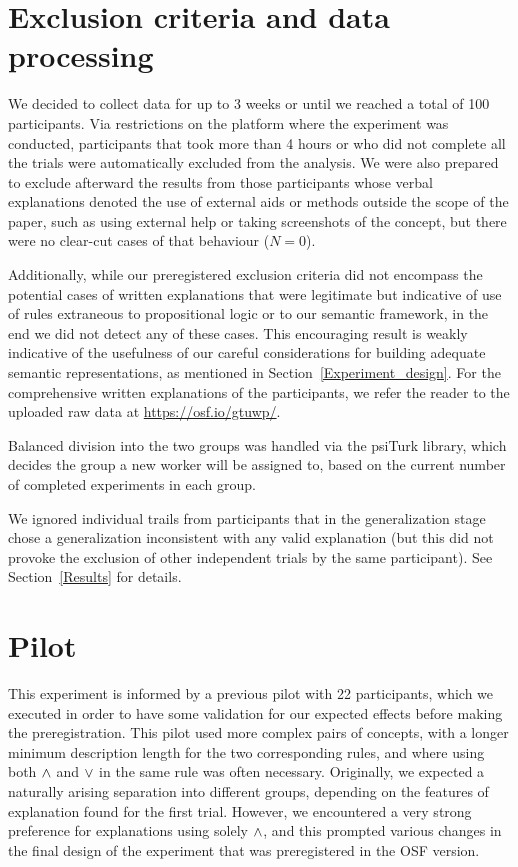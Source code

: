 \newpage
\begin{appendices}



\section{Exclusion criteria and data processing}\label{Sec:ExclusionCriteria}

We decided to collect data for up to 3 weeks or until we reached a total of 100 participants. Via restrictions on the platform where the experiment was conducted, participants that took more than 4 hours or who did not complete all the trials were automatically excluded from the analysis. We were also prepared to exclude afterward the results from those participants whose verbal explanations denoted the use of external aids or methods outside the scope of the paper, such as using external help or taking screenshots of the concept, but there were no clear-cut cases of that behaviour ($N=0$).  

 Additionally, while our preregistered exclusion criteria did not encompass the potential cases of written explanations that were legitimate but indicative of use of rules extraneous to propositional logic or to our semantic framework, in the end we did not detect any of these cases. This encouraging result is weakly indicative of the usefulness of our careful considerations for building adequate semantic representations, as mentioned in Section~\ref{Experiment_design}. For the comprehensive written explanations of the participants, we refer the reader to the uploaded raw data at \url{https://osf.io/gtuwp/}.  


Balanced division into the two groups was handled via the psiTurk library, which decides the group a new worker will be assigned to, based on the current number of completed experiments in each group. 

 We ignored individual trails from participants that in the generalization stage chose a generalization inconsistent with any valid explanation (but this did not provoke the exclusion of other independent trials by the same participant). See Section~\ref{Results} for details. 


\section{Pilot} \label{subsection:resultsPilot}
This experiment  is  informed by a previous pilot with 22 participants, which we executed in order to have some validation for our expected effects before making the preregistration. This pilot used more complex pairs of concepts, with a longer minimum description length for the two corresponding rules, and where using both $\land$ and $\lor$ in the same rule was often necessary. 
Originally, we expected a naturally arising separation into different groups, depending on the features of explanation found for the first trial. However, we encountered a very strong preference for explanations using solely $\land$, and this prompted various changes in the final design of the experiment that was preregistered in the OSF version.


\end{appendices}
